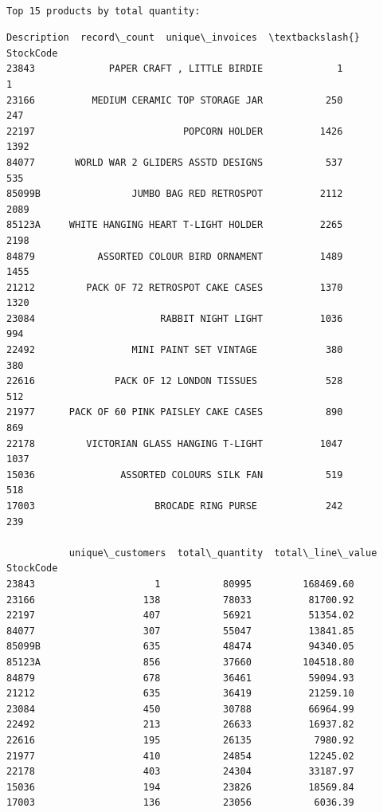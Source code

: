 \documentclass[11pt]{article}
\begin{document}
    
    \begin{Verbatim}[commandchars=\\\{\}]

Top 15 products by total quantity:
    \end{Verbatim}

    
    \begin{Verbatim}[commandchars=\\\{\}]
                                  Description  record\_count  unique\_invoices  \textbackslash{}
StockCode                                                                      
23843             PAPER CRAFT , LITTLE BIRDIE             1                1   
23166          MEDIUM CERAMIC TOP STORAGE JAR           250              247   
22197                          POPCORN HOLDER          1426             1392   
84077       WORLD WAR 2 GLIDERS ASSTD DESIGNS           537              535   
85099B                JUMBO BAG RED RETROSPOT          2112             2089   
85123A     WHITE HANGING HEART T-LIGHT HOLDER          2265             2198   
84879           ASSORTED COLOUR BIRD ORNAMENT          1489             1455   
21212         PACK OF 72 RETROSPOT CAKE CASES          1370             1320   
23084                      RABBIT NIGHT LIGHT          1036              994   
22492                 MINI PAINT SET VINTAGE            380              380   
22616              PACK OF 12 LONDON TISSUES            528              512   
21977      PACK OF 60 PINK PAISLEY CAKE CASES           890              869   
22178         VICTORIAN GLASS HANGING T-LIGHT          1047             1037   
15036               ASSORTED COLOURS SILK FAN           519              518   
17003                     BROCADE RING PURSE            242              239   

           unique\_customers  total\_quantity  total\_line\_value  
StockCode                                                      
23843                     1           80995         168469.60  
23166                   138           78033          81700.92  
22197                   407           56921          51354.02  
84077                   307           55047          13841.85  
85099B                  635           48474          94340.05  
85123A                  856           37660         104518.80  
84879                   678           36461          59094.93  
21212                   635           36419          21259.10  
23084                   450           30788          66964.99  
22492                   213           26633          16937.82  
22616                   195           26135           7980.92  
21977                   410           24854          12245.02  
22178                   403           24304          33187.97  
15036                   194           23826          18569.84  
17003                   136           23056           6036.39  
    \end{Verbatim}
\end{document}
